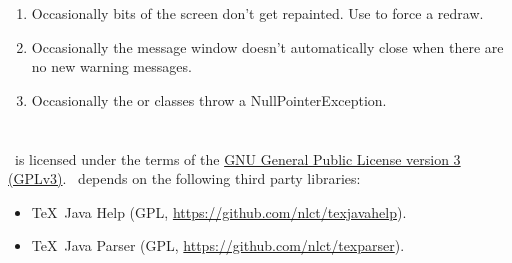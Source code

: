 \begin{enumerate}
\item Occasionally bits of the screen don't get repainted.
Use  to force a redraw.

\item Occasionally the message window doesn't automatically close
when there are no new warning messages.

\item Occasionally the  or 
classes throw a NullPointerException.

\end{enumerate}

\chapter{}
\label{sec:licence}

%
\FlowframTk\ is licensed under the terms of the 
\href{https://www.gnu.org/licenses/gpl-3.0.html}{GNU General
Public License version 3 (GPLv3)}.
\FlowframTk\ depends on the following third party libraries:
\begin{itemize}
   \item \TeX\ Java Help 
   (GPL, \url{https://github.com/nlct/texjavahelp}).
   \item \TeX\ Java Parser 
   (GPL, \url{https://github.com/nlct/texparser}).
\end{itemize}





\appto{}

\printmain
\printindex 

 

